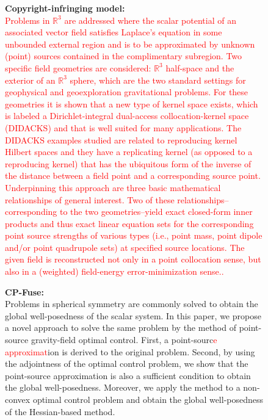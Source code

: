 \begin{figure}[!htbp]
    \begin{mdframed}[
        backgroundcolor=lightgray,
        linewidth=2pt,
        linecolor=lightblue,
        frametitle={\textbf{Prompt:} A Dirichlet-integral based dual-access collocation-kernel approach to point-source gravity-field modeling},
        frametitlebackgroundcolor=lightblue!20,
        roundcorner=10pt,
        innerleftmargin=10pt,
        innerrightmargin=10pt,
        innertopmargin=10pt,
        innerbottommargin=10pt
    ]
    \raggedright
    \begin{minipage}[t]{\textwidth}
        \textbf{Copyright-infringing model:} \\
        \textcolor{red}{Problems in $\mathbb{R}^3$ are addressed where the scalar potential of an associated vector field satisfies Laplace's equation in some unbounded external region and is to be approximated by unknown (point) sources contained in the complimentary subregion. Two specific field geometries are considered: $\mathbb{R}^3$ half-space and the exterior of an $\mathbb{R}^3$ sphere, which are the two standard settings for geophysical and geoexploration gravitational problems. For these geometries it is shown that a new type of kernel space exists, which is labeled a Dirichlet-integral dual-access collocation-kernel space (DIDACKS) and that is well suited for many applications. The DIDACKS examples studied are related to reproducing kernel Hilbert spaces and they have a replicating kernel (as opposed to a reproducing kernel) that has the ubiquitous form of the inverse of the distance between a field point and a corresponding source point. Underpinning this approach are three basic mathematical relationships of general interest. Two of these relationships--corresponding to the two geometries--yield exact closed-form inner products and thus exact linear equation sets for the corresponding point source strengths of various types (i.e., point mass, point dipole and/or point quadrupole sets) at specified source locations. The given field is reconstructed not only in a point collocation sense, but also in a (weighted) field-energy error-minimization sense..} \\
    \end{minipage}
    \vspace{10pt}
    \begin{minipage}[t]{\textwidth}
        \textbf{CP-Fuse:} \\
Problems in spherical symmetry are commonly solved to obtain the global well-posedness of the scalar system. In this paper, we propose a novel approach to solve the same problem by the method of point-source gravity-field optimal control. First, a point-sourc\textcolor{red}{e approximat}ion is derived to the original problem. Second, by using the adjointness of the optimal control problem, we show that the point-source approximation is also a sufficient condition to obtain the global well-posedness. Moreover, we apply the method to a non-convex optimal control problem and obtain the global well-posedness of the Hessian-based method. \end{minipage}

\end{mdframed}
\end{figure}
